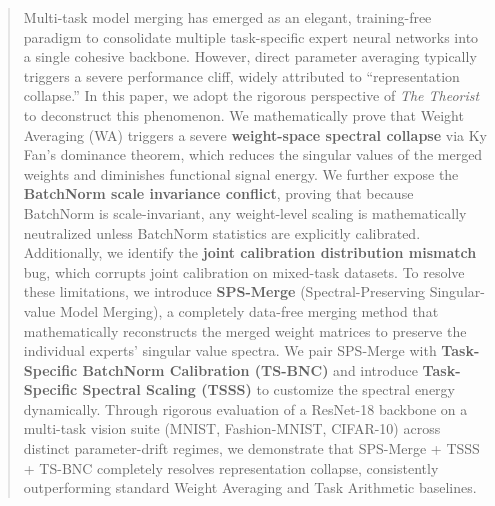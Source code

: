 \documentclass{article}
\theoremstyle{plain}
\theoremstyle{definition}
\theoremstyle{remark}
\begin{document}

\printAffiliationsAndNotice{}

\begin{abstract}
Multi-task model merging has emerged as an elegant, training-free paradigm to consolidate multiple task-specific expert neural networks into a single cohesive backbone. However, direct parameter averaging typically triggers a severe performance cliff, widely attributed to ``representation collapse.'' In this paper, we adopt the rigorous perspective of \textit{The Theorist} to deconstruct this phenomenon. We mathematically prove that Weight Averaging (WA) triggers a severe \textbf{weight-space spectral collapse} via Ky Fan's dominance theorem, which reduces the singular values of the merged weights and diminishes functional signal energy. We further expose the \textbf{BatchNorm scale invariance conflict}, proving that because BatchNorm is scale-invariant, any weight-level scaling is mathematically neutralized unless BatchNorm statistics are explicitly calibrated. Additionally, we identify the \textbf{joint calibration distribution mismatch} bug, which corrupts joint calibration on mixed-task datasets. To resolve these limitations, we introduce \textbf{SPS-Merge} (Spectral-Preserving Singular-value Model Merging), a completely data-free merging method that mathematically reconstructs the merged weight matrices to preserve the individual experts' singular value spectra. We pair SPS-Merge with \textbf{Task-Specific BatchNorm Calibration (TS-BNC)} and introduce \textbf{Task-Specific Spectral Scaling (TSSS)} to customize the spectral energy dynamically. Through rigorous evaluation of a ResNet-18 backbone on a multi-task vision suite (MNIST, Fashion-MNIST, CIFAR-10) across distinct parameter-drift regimes, we demonstrate that SPS-Merge + TSSS + TS-BNC completely resolves representation collapse, consistently outperforming standard Weight Averaging and Task Arithmetic baselines.
\end{abstract}
\end{document}

